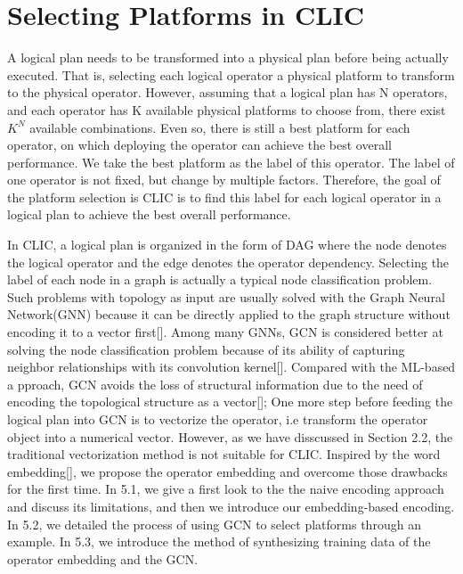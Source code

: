 
\section{Selecting Platforms in CLIC}

A logical plan needs to be transformed into a physical plan before being actually executed.
That is, selecting each logical operator a physical platform to transform to the physical operator.
However, assuming that a logical plan has N operators, and each operator has K available physical platforms to choose from, 
there exist $K^N$ available combinations.
Even so, there is still a best platform for each operator, on which deploying the operator can achieve the best overall performance. 
We take the best platform as the label of this operator.
The label of one operator is not fixed, but change by multiple factors.
Therefore, the goal of the platform selection is CLIC is to find this label for each logical operator in a logical plan to achieve the best overall performance.


In CLIC, a logical plan is organized in the form of DAG where the node denotes the logical operator and the edge denotes the operator dependency.
Selecting the label of each node in a graph is actually a typical node classification problem.
Such problems with topology as input are usually solved with the Graph Neural Network(GNN) because it can be directly applied to the graph structure without encoding it to a vector first[].
Among many GNNs, GCN is considered better at solving the node classification problem because of its ability of capturing neighbor relationships with its convolution kernel[].
Compared with the ML-based a pproach, GCN avoids the loss of structural information due to the need of encoding the topological structure as a vector[];
One more step before feeding the logical plan into GCN is to vectorize the operator, i.e transform the operator object into a numerical vector.
However, as we have disscussed in Section 2.2, the traditional vectorization method is not suitable for CLIC. 
Inspired by the word embedding[], we propose the operator embedding and overcome those drawbacks for the first time.
In 5.1, we give a first look to the the naive encoding approach and discuss its limitations, and then we introduce our embedding-based encoding.
In 5.2, we detailed the process of using GCN to select platforms through an example.
In 5.3, we introduce the method of synthesizing training data of the operator embedding and the GCN.

